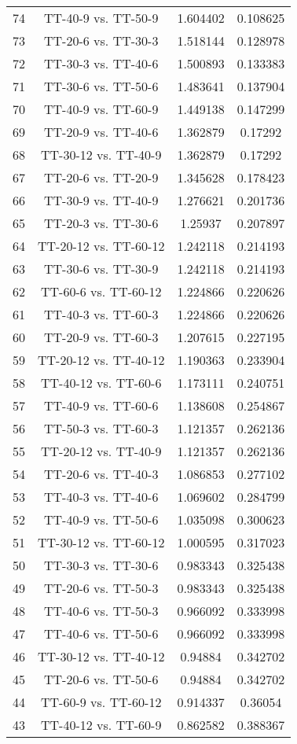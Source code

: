 \documentclass[a4paper,10pt]{article}
\begin{document}
\begin{landscape}
\begin{table}[!htp]
\begin{tabular}{cccc}
74&TT-40-9 vs. TT-50-9&1.604402&0.108625\\
73&TT-20-6 vs. TT-30-3&1.518144&0.128978\\
72&TT-30-3 vs. TT-40-6&1.500893&0.133383\\
71&TT-30-6 vs. TT-50-6&1.483641&0.137904\\
70&TT-40-9 vs. TT-60-9&1.449138&0.147299\\
69&TT-20-9 vs. TT-40-6&1.362879&0.17292\\
68&TT-30-12 vs. TT-40-9&1.362879&0.17292\\
67&TT-20-6 vs. TT-20-9&1.345628&0.178423\\
66&TT-30-9 vs. TT-40-9&1.276621&0.201736\\
65&TT-20-3 vs. TT-30-6&1.25937&0.207897\\
64&TT-20-12 vs. TT-60-12&1.242118&0.214193\\
63&TT-30-6 vs. TT-30-9&1.242118&0.214193\\
62&TT-60-6 vs. TT-60-12&1.224866&0.220626\\
61&TT-40-3 vs. TT-60-3&1.224866&0.220626\\
60&TT-20-9 vs. TT-60-3&1.207615&0.227195\\
59&TT-20-12 vs. TT-40-12&1.190363&0.233904\\
58&TT-40-12 vs. TT-60-6&1.173111&0.240751\\
57&TT-40-9 vs. TT-60-6&1.138608&0.254867\\
56&TT-50-3 vs. TT-60-3&1.121357&0.262136\\
55&TT-20-12 vs. TT-40-9&1.121357&0.262136\\
54&TT-20-6 vs. TT-40-3&1.086853&0.277102\\
53&TT-40-3 vs. TT-40-6&1.069602&0.284799\\
52&TT-40-9 vs. TT-50-6&1.035098&0.300623\\
51&TT-30-12 vs. TT-60-12&1.000595&0.317023\\
50&TT-30-3 vs. TT-30-6&0.983343&0.325438\\
49&TT-20-6 vs. TT-50-3&0.983343&0.325438\\
48&TT-40-6 vs. TT-50-3&0.966092&0.333998\\
47&TT-40-6 vs. TT-50-6&0.966092&0.333998\\
46&TT-30-12 vs. TT-40-12&0.94884&0.342702\\
45&TT-20-6 vs. TT-50-6&0.94884&0.342702\\
44&TT-60-9 vs. TT-60-12&0.914337&0.36054\\
43&TT-40-12 vs. TT-60-9&0.862582&0.388367\\

\end{tabular}
\end{table}
\end{landscape}
\end{document}
